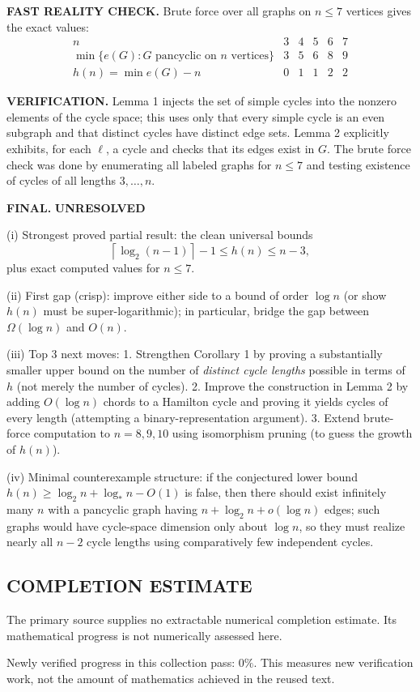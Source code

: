 \medskip
\noindent\textbf{FAST REALITY CHECK.}
Brute force over all graphs on $n\le 7$ vertices gives the exact values:
\[
\begin{array}{c|ccccc}
 n & 3 & 4 & 5 & 6 & 7\\\hline
 \min\{e(G):G\text{ pancyclic on }n\text{ vertices}\} & 3 & 5 & 6 & 8 & 9\\
 h(n)=\min e(G)-n & 0 & 1 & 1 & 2 & 2
\end{array}
\]

\medskip
\noindent\textbf{VERIFICATION.}
Lemma 1 injects the set of simple cycles into the nonzero elements of the cycle space; this uses only that every simple cycle is an even subgraph and that distinct cycles have distinct edge sets.
Lemma 2 explicitly exhibits, for each $\ell$, a cycle and checks that its edges exist in $G$.
The brute force check was done by enumerating all labeled graphs for $n\le 7$ and testing existence of cycles of all lengths $3,\dots,n$.

\medskip
\noindent\textbf{FINAL.}
\textbf{UNRESOLVED}

(i) Strongest proved partial result: the clean universal bounds
\[\left\lceil \log_2(n-1)\right\rceil -1\le h(n)\le n-3,\]
plus exact computed values for $n\le 7$.

(ii) First gap (crisp): improve either side to a bound of order $\log n$ (or show $h(n)$ must be super-logarithmic); in particular, bridge the gap between $\Omega(\log n)$ and $O(n)$.

(iii) Top 3 next moves:
1. Strengthen Corollary 1 by proving a substantially smaller upper bound on the number of \emph{distinct cycle lengths} possible in terms of $h$ (not merely the number of cycles).
2. Improve the construction in Lemma 2 by adding $O(\log n)$ chords to a Hamilton cycle and proving it yields cycles of every length (attempting a binary-representation argument).
3. Extend brute-force computation to $n=8,9,10$ using isomorphism pruning (to guess the growth of $h(n)$).

(iv) Minimal counterexample structure: if the conjectured lower bound $h(n)\ge \log_2 n+\log_* n-O(1)$ is false, then there should exist infinitely many $n$ with a pancyclic graph having $n+\log_2 n+o(\log n)$ edges; such graphs would have cycle-space dimension only about $\log n$, so they must realize nearly all $n-2$ cycle lengths using comparatively few independent cycles.




\subsection*{COMPLETION ESTIMATE}
The primary source supplies no extractable numerical completion estimate. Its mathematical progress is not numerically assessed here.

Newly verified progress in this collection pass: $0\%$. This measures new verification work, not the amount of mathematics achieved in the reused text.
